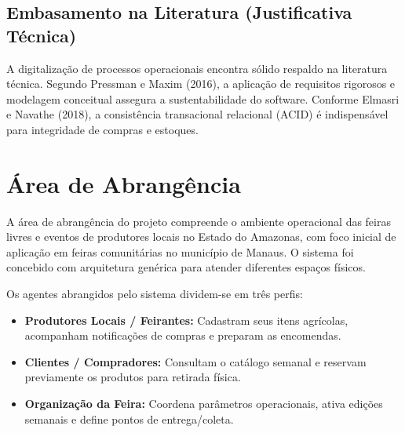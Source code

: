 \documentclass[12pt,a4paper]{article}
\begin{document}
\subsection{Embasamento na Literatura (Justificativa Técnica)}

A digitalização de processos operacionais encontra sólido respaldo na literatura técnica. Segundo Pressman e Maxim (2016), a aplicação de requisitos rigorosos e modelagem conceitual assegura a sustentabilidade do software. Conforme Elmasri e Navathe (2018), a consistência transacional relacional (ACID) é indispensável para integridade de compras e estoques.

\newpage


\section{Área de Abrangência}

A área de abrangência do projeto compreende o ambiente operacional das feiras livres e eventos de produtores locais no Estado do Amazonas, com foco inicial de aplicação em feiras comunitárias no município de Manaus. O sistema foi concebido com arquitetura genérica para atender diferentes espaços físicos.

Os agentes abrangidos pelo sistema dividem-se em três perfis:

\begin{itemize}[leftmargin=1.5cm]

    \item \textbf{Produtores Locais / Feirantes:} Cadastram seus itens agrícolas, acompanham notificações de compras e preparam as encomendas.

    \item \textbf{Clientes / Compradores:} Consultam o catálogo semanal e reservam previamente os produtos para retirada física.

    \item \textbf{Organização da Feira:} Coordena parâmetros operacionais, ativa edições semanais e define pontos de entrega/coleta.

\end{itemize}

\newpage

\end{document}
